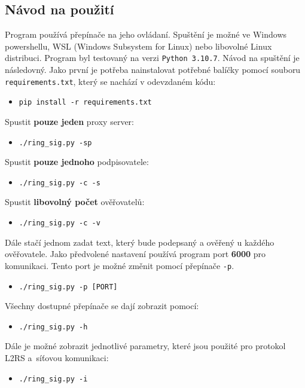\subsection{Návod na použití}
Program používá přepínače na jeho ovládaní. Spuštění je možné ve Windows powershellu, WSL (Windows Subsystem for Linux) nebo libovolné Linux distribuci. Program byl testovaný na verzi \texttt{Python 3.10.7}. Návod na spuštění je následovný. Jako první je potřeba nainstalovat potřebné balíčky pomocí souboru \texttt{requirements.txt}, který se nachází v odevzdaném kódu:
\begin{itemize}
  \item \texttt{pip install -r requirements.txt}
\end{itemize}
Spustit \textbf{pouze jeden} proxy server:
\begin{itemize}
  \item \texttt{./ring\_sig.py -sp}
\end{itemize}
Spustit \textbf{pouze jednoho} podpisovatele:
\begin{itemize}
  \item \texttt{./ring\_sig.py -c -s}
\end{itemize}
Spustit \textbf{libovolný počet} ověřovatelů:
\begin{itemize}
  \item \texttt{./ring\_sig.py -c -v}
\end{itemize}
Dále stačí jednom zadat text, který bude podepsaný a ověřený u každého ověřovatele. Jako předvolené nastavení používá program port \textbf{6000} pro komunikaci. Tento port je možné změnit pomocí přepínače \texttt{-p}.
\begin{itemize}
  \item \texttt{./ring\_sig.py -p [PORT]}
\end{itemize}
Všechny dostupné přepínače se dají zobrazit pomocí:
\begin{itemize}
  \item \texttt{./ring\_sig.py -h}
\end{itemize}
Dále je možné zobrazit jednotlivé parametry, které jsou použité pro protokol L2RS a~síťovou komunikaci:
\begin{itemize}
  \item \texttt{./ring\_sig.py -i}
\end{itemize}


